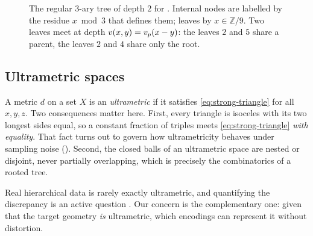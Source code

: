 \begin{figure}
  \centering
  \caption{The regular $3$-ary tree of depth $2$ for . Internal
    nodes are labelled by the residue $x \bmod 3$ that defines them; leaves by
    $x \in \mathbb{Z}/9$. Two leaves meet at depth $v(x,y) = v_p(x-y)$: the leaves $2$
    and $5$ share a parent, the leaves $2$ and $4$ share only the root.}
  \label{fig:padic-tree}
\end{figure}

\subsection{Ultrametric spaces}

A metric $d$ on a set $X$ is an \emph{ultrametric} if it satisfies
\cref{eq:strong-triangle} for all $x, y, z$. Two consequences matter here. First, every
triangle is isoceles with its two longest sides equal, so a constant fraction of
triples meets \cref{eq:strong-triangle} \emph{with equality}. That fact turns out
to govern how ultrametricity behaves under sampling noise
(). Second, the closed balls of an ultrametric space are nested
or disjoint, never partially overlapping, which is precisely the combinatorics of a
rooted tree.

Real hierarchical data is rarely exactly ultrametric, and quantifying the discrepancy
is an active question \citep{Bradley2025LocalUltrametricity}. Our concern is the
complementary one: given that the target geometry \emph{is} ultrametric, which
encodings can represent it without distortion.

